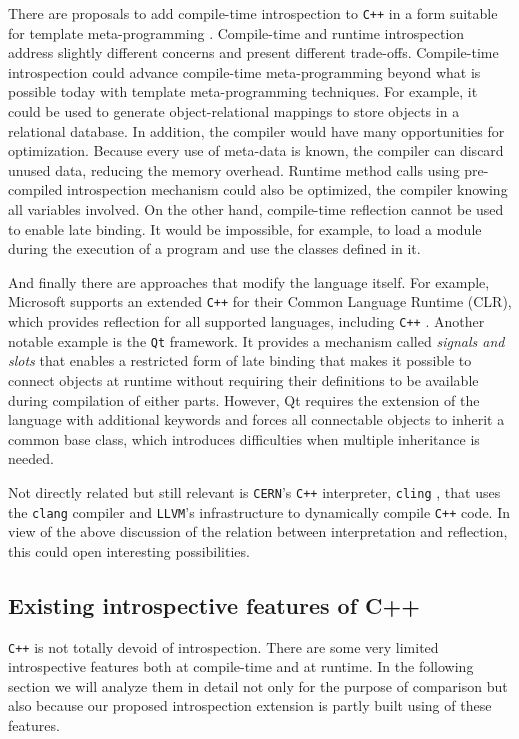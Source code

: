 There are proposals to add compile-time introspection to \texttt{C++} in a form suitable for template meta-programming \cite{Chochlik}.
Compile-time and runtime introspection address slightly different concerns and present different trade-offs. Compile-time
introspection could advance compile-time meta-programming beyond what is possible today with template meta-programming techniques.
For example, it could be used to generate object-relational mappings to store objects in a relational database.
In addition, the compiler would have many opportunities for optimization. Because every use of meta-data is known, the compiler
can discard unused data, reducing the memory overhead. Runtime method calls using pre-compiled introspection mechanism could
also be optimized, the compiler knowing all variables involved. On the other hand, compile-time reflection cannot be used to
enable late binding. It would be impossible, for example, to load a module during the execution of a program and
use the classes defined in it.

And finally there are approaches that modify the language itself. For example, Microsoft supports an extended \texttt{C++} for their
Common Language Runtime (CLR), which provides reflection for all supported languages, including \texttt{C++} \cite{CLR}. Another notable
example is the \texttt{Qt} framework. It provides a mechanism called \emph{signals and slots} that enables a restricted form
of late binding that makes it possible to connect objects at runtime without requiring their definitions to be available during compilation of either parts.
However, Qt requires the extension of the language with additional keywords and forces all connectable objects to inherit a common base class, which introduces
difficulties when multiple inheritance is needed. 

Not directly related but still relevant is \texttt{CERN}'s \texttt{C++} interpreter, \texttt{cling} \cite{cling}, that uses the \texttt{clang}
\cite{cling} compiler and \texttt{LLVM}'s infrastructure to dynamically compile \texttt{C++} code. In view of the above discussion of the relation between
interpretation and reflection, this could open interesting possibilities.

\subsection{Existing introspective features of C++}

\texttt{C++} is not totally devoid of introspection. There are some very limited introspective features both at compile-time and
at runtime. In the following section we will analyze them in detail not only for the purpose of comparison but also because
our proposed introspection extension is partly built using of these features.

